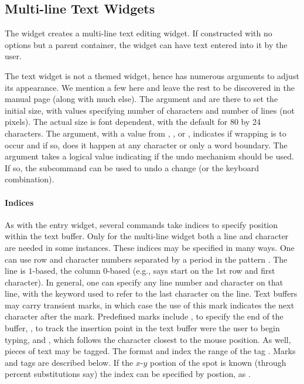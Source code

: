 \subsection{Multi-line Text Widgets}
\label{sec:tcltk:multi-line-text}


The  widget creates a multi-line text editing
widget. If constructed with no options but a parent container, the
widget can have text entered into it by the user.
%

The text widget is not a themed widget, hence has numerous arguments
to adjust its appearance. We mention a few here and leave the rest to
be discovered in the manual page (along with much else). The argument
 and  are there to
set the initial size, with values specifying number of characters and
number of lines (not pixels). The actual size is font dependent, with
the default for 80 by 24 characters. The 
argument, with a value from , , or
, indicates if wrapping is to occur and if so, does it
happen at any character or only a word boundary. The argument
 takes a logical value indicating if the undo
mechanism should be used. If so, the subcommand
 can be used to undo a change (or the
 keyboard combination).



\paragraph{Indices}
As with the entry widget, several commands take indices to specify
position within the text buffer. Only for the multi-line widget both a
line and character are needed in some instances. These indices may be
specified in many ways. One can use row and character numbers
separated by a period in the pattern . The line is
$1$-based, the column $0$-based (e.g.,  says start on the
1st row and first character). In general, one can specify any line
number and character on that line, with the keyword  used to
refer to the last character on the line. Text buffers may carry
transient marks, in which case the use of this mark indicates the next
character after the mark. Predefined marks include , to  specify the end of the
buffer, , to track the insertion point in the text
buffer were the user to begin typing, and , which 
follows the character closest to the mouse position. As well, pieces
of text may be tagged. The format  and 
index the range of the tag . Marks and tags are described
below. If the $x$-$y$ postion of the spot is known (through percent
substitutions say) the index can be specified by postion, as .

